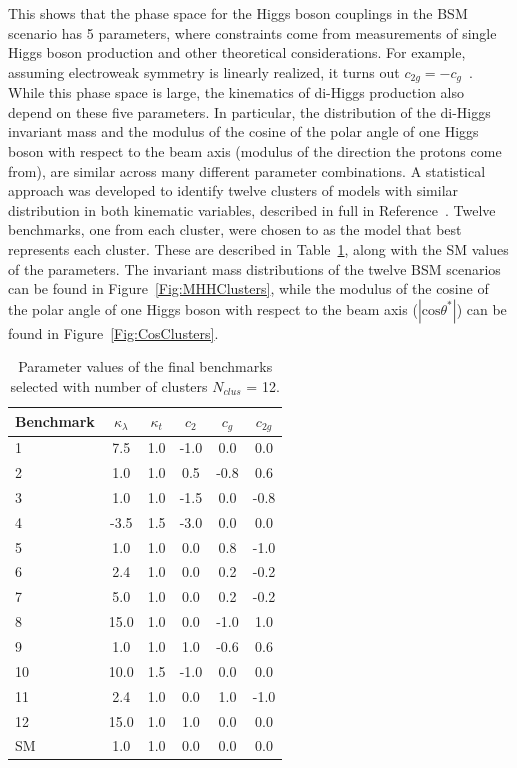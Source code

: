 This shows that the phase space for the Higgs boson couplings in the BSM scenario has 5 parameters, where constraints come from measurements of single Higgs boson production and other theoretical considerations. For example, assuming electroweak symmetry is linearly realized, it turns out $c_{2g} = - c_g$~\cite{Giudice:2007fh,BUCHMULLER1986621}. While this phase space is large, the kinematics of di-Higgs production also depend on these five parameters. In particular, the distribution of the di-Higgs invariant mass and the modulus of the cosine of the polar angle of one Higgs boson with respect to the beam axis (modulus of the direction the protons come from), are similar across many different parameter combinations. 
A statistical approach was developed to identify twelve clusters of models with similar distribution in both kinematic variables, described in full in Reference~\cite{Carvalho2016}. Twelve benchmarks, one from each cluster, were chosen to as the model that best represents each cluster. These are described in Table~\ref{tab:benchmarks}, along with the SM values of the parameters. The invariant mass distributions of the twelve BSM scenarios can be found in Figure~\ref{Fig:MHHClusters}, while the modulus of the cosine of the polar angle of one Higgs boson with respect to the beam axis ($|\text{cos}\theta^{\ast}|$) can be found in Figure~\ref{Fig:CosClusters}.

\begin{table}[htb]
\begin{center}
\begin{tabular}{|l|c|c|c|c|c|}
\hline
Benchmark & $\kappa_{\lambda}$ & $\kappa_{t}$ & $c_2$ & $c_g$ & $c_{2g}$ \\ \hline 
1 & 7.5 & 1.0 & -1.0 & 0.0 & 0.0\\
2 & 1.0 & 1.0 & 0.5 & -0.8 & 0.6 \\
3 & 1.0 & 1.0 & -1.5 & 0.0 & -0.8 \\
4 & -3.5 & 1.5 & -3.0 & 0.0 & 0.0 \\
5 & 1.0 & 1.0 & 0.0 & 0.8 & -1.0 \\
6 & 2.4 & 1.0 & 0.0 & 0.2 & -0.2 \\
7 & 5.0 & 1.0 & 0.0 & 0.2 & -0.2 \\
8 & 15.0 & 1.0 & 0.0 & -1.0 & 1.0 \\
9 & 1.0 & 1.0 & 1.0 & -0.6 & 0.6 \\
10 & 10.0 & 1.5 & -1.0 & 0.0 & 0.0 \\
11 & 2.4 & 1.0 & 0.0 & 1.0 & -1.0 \\
12 & 15.0 & 1.0 & 1.0 & 0.0 & 0.0 \\
SM & 1.0 & 1.0 & 0.0 & 0.0 & 0.0 \\
\hline
\end{tabular}
\end{center}
\caption{Parameter values of the final benchmarks selected with number of clusters $N_{clus}$ = 12.}
\label{tab:benchmarks}
\end{table}

